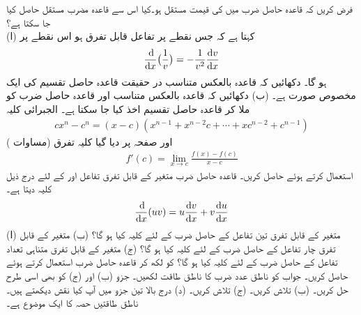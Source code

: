 فرض کریں کہ قاعدہ حاصل ضرب میں  کی قیمت مستقل  ہو۔کیا اس سے قاعدہ مضرب مستقل حاصل کیا جا سکتا ہے؟
\\
(ا)  کہتا ہے کہ جس نقطے پر تفاعل  قابل تفرق ہو اس نقطے پر 
\begin{align*}
\frac{\dif}{\dif x}\big(\frac{1}{v}\big)=-\frac{1}{v^2}\frac{\dif v}{\dif x}
\end{align*}
ہو گا۔ دکھائیں کہ قاعدہ بالعکس متناسب در حقیقت قاعدہ حاصل تقسیم کی ایک مخصوص صورت ہے۔ (ب) دکھائیں کہ قاعدہ بالعکس متناسب اور قاعدہ حاصل ضرب کو ملا کر قاعدہ حاصل تقسیم  اخذ کیا جا سکتا ہے۔
\quad
الجبرائی کلیہ
\begin{align*}
cx^n-c^n=(x-c)(x^{n-1}+x^{n-2}c+\cdots+xc^{n-2}+c^{n-1})
\end{align*}
اور صفحہ  پر دیا گیا کلیہ تفرق (مساوات )
\begin{align*}
f'(c)=\lim_{x\to c} \frac{f(x)-f(c)}{x-c}
\end{align*}
استعمال کرتے ہوئے  حاصل کریں۔
\quad
قاعدہ حاصل ضرب متغیر  کے قابل تفرق تفاعل  اور  کے لئے  درج ذیل کلیہ دیتا ہے۔
\begin{align*}
\frac{\dif}{\dif x}(uv)=u\frac{\dif v}{\dif x}+v\frac{\dif u}{\dif x}
\end{align*}
(ا) متغیر  کے قابل تفرق تین تفاعل کے حاصل ضرب  کے لئے کلیہ کیا ہو گا؟ (ب) متغیر  کے قابل تفرق چار تفاعل کے حاصل ضرب  کے لئے کلیہ کیا ہو گا؟ (ج) متغیر  کے قابل تفرق متناہی تعداد  تفاعل کے حاصل ضرب  کے لئے کلیہ کیا ہو گا؟
 کو  لکھ کر قاعدہ حاصل ضرب استعمال کرتے ہوئے  حاصل کریں۔ جواب کو ناطق عدد ضرب  کا ناطق طاقت لکھیں۔ جزو (ب) اور (ج) کو بھی اسی طرح حل کریں۔ (ب)  تلاش کریں۔ (ج)  تلاش کریں۔ (د) درج بالا تین جزو میں آپ کیا نقش دیکھتے ہیں۔ ناطق طاقتیں حصہ  کا ایک موضوع ہے۔

